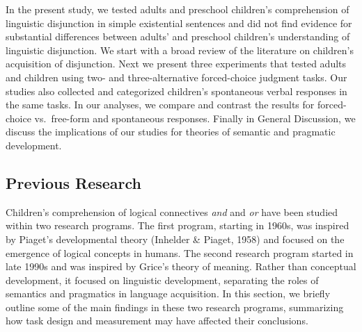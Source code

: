 \documentclass[,man,floatsintext]{apa6}
\begin{document}
In the present study, we tested adults and preschool children's comprehension of linguistic disjunction in simple existential sentences and did not find evidence for substantial differences between adults' and preschool children's understanding of linguistic disjunction. We start with a broad review of the literature on children's acquisition of disjunction. Next we present three experiments that tested adults and children using two- and three-alternative forced-choice judgment tasks. Our studies also collected and categorized children's spontaneous verbal responses in the same tasks. In our analyses, we compare and contrast the results for forced-choice vs.~free-form and spontaneous responses. Finally in General Discussion, we discuss the implications of our studies for theories of semantic and pragmatic development.

\hypertarget{litreview}{%
\subsection{Previous Research}\label{litreview}}

Children's comprehension of logical connectives \emph{and} and \emph{or} have been studied within two research programs. The first program, starting in 1960s, was inspired by Piaget's developmental theory (Inhelder \& Piaget, 1958) and focused on the emergence of logical concepts in humans. The second research program started in late 1990s and was inspired by Grice's theory of meaning. Rather than conceptual development, it focused on linguistic development, separating the roles of semantics and pragmatics in language acquisition. In this section, we briefly outline some of the main findings in these two research programs, summarizing how task design and measurement may have affected their conclusions.
\end{document}
